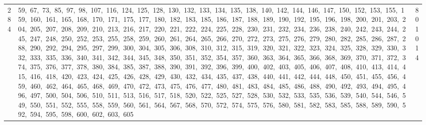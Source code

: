 \begin{longtable}{c|p{}|r}
284 & 59,\ 67,\ 73,\ 85,\ 97,\ 98,\ 107,\ 116,\ 124,\ 125,\ 128,\ 130,\ 132,\ 133,\ 134,\ 135,\ 138,\ 140,\ 142,\ 144,\ 146,\ 147,\ 150,\ 152,\ 153,\ 155,\ 159,\ 160,\ 161,\ 165,\ 168,\ 170,\ 171,\ 175,\ 177,\ 180,\ 182,\ 183,\ 185,\ 186,\ 187,\ 188,\ 189,\ 190,\ 192,\ 195,\ 196,\ 198,\ 200,\ 201,\ 203,\ 204,\ 205,\ 207,\ 208,\ 209,\ 210,\ 213,\ 216,\ 217,\ 220,\ 221,\ 222,\ 224,\ 225,\ 228,\ 230,\ 231,\ 232,\ 234,\ 236,\ 238,\ 240,\ 242,\ 243,\ 244,\ 245,\ 247,\ 248,\ 250,\ 252,\ 253,\ 255,\ 258,\ 259,\ 260,\ 261,\ 264,\ 265,\ 266,\ 270,\ 272,\ 273,\ 275,\ 276,\ 279,\ 280,\ 282,\ 285,\ 286,\ 287,\ 288,\ 290,\ 292,\ 294,\ 295,\ 297,\ 299,\ 300,\ 304,\ 305,\ 306,\ 308,\ 310,\ 312,\ 315,\ 319,\ 320,\ 321,\ 322,\ 323,\ 324,\ 325,\ 328,\ 329,\ 330,\ 332,\ 333,\ 335,\ 336,\ 340,\ 341,\ 342,\ 344,\ 345,\ 348,\ 350,\ 351,\ 352,\ 354,\ 357,\ 360,\ 363,\ 364,\ 365,\ 366,\ 368,\ 369,\ 370,\ 371,\ 372,\ 374,\ 375,\ 376,\ 377,\ 378,\ 380,\ 384,\ 385,\ 387,\ 388,\ 390,\ 391,\ 392,\ 396,\ 399,\ 400,\ 402,\ 403,\ 405,\ 406,\ 407,\ 408,\ 410,\ 413,\ 414,\ 415,\ 416,\ 418,\ 420,\ 423,\ 424,\ 425,\ 426,\ 428,\ 429,\ 430,\ 432,\ 434,\ 435,\ 437,\ 438,\ 440,\ 441,\ 442,\ 444,\ 448,\ 450,\ 451,\ 455,\ 456,\ 459,\ 460,\ 462,\ 464,\ 465,\ 468,\ 469,\ 470,\ 472,\ 473,\ 475,\ 476,\ 477,\ 480,\ 481,\ 483,\ 484,\ 485,\ 486,\ 488,\ 490,\ 492,\ 493,\ 494,\ 495,\ 496,\ 497,\ 500,\ 504,\ 506,\ 510,\ 511,\ 513,\ 516,\ 517,\ 518,\ 520,\ 522,\ 525,\ 527,\ 528,\ 530,\ 532,\ 533,\ 535,\ 536,\ 539,\ 540,\ 544,\ 546,\ 549,\ 550,\ 551,\ 552,\ 555,\ 558,\ 559,\ 560,\ 561,\ 564,\ 567,\ 568,\ 570,\ 572,\ 574,\ 575,\ 576,\ 580,\ 581,\ 582,\ 583,\ 585,\ 588,\ 589,\ 590,\ 592,\ 594,\ 595,\ 598,\ 600,\ 602,\ 603,\ 605 & 801014 \\

\end{longtable}
